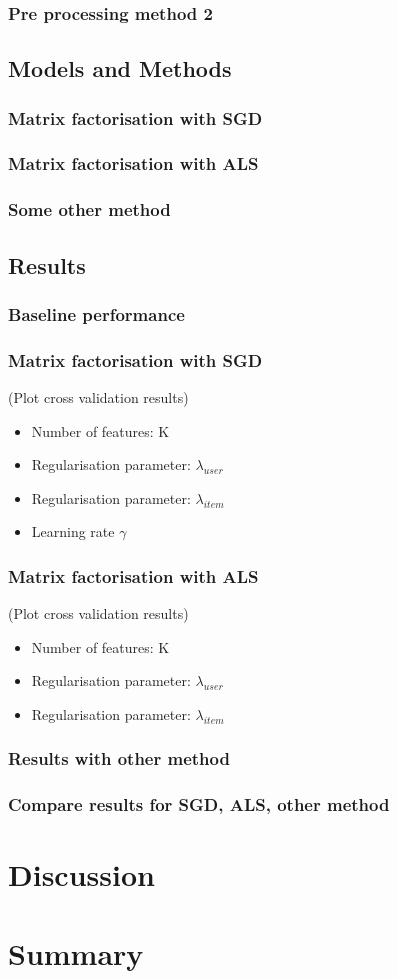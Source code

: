 \documentclass[10pt,conference,compsocconf]{IEEEtran}
\begin{document}
\subsubsection{Pre processing method 2}


\subsection{Models and Methods}
\subsubsection{Matrix factorisation with SGD}
\subsubsection{Matrix factorisation with ALS}
\subsubsection{Some other method}


\subsection{Results}
\subsubsection{Baseline performance}
\subsubsection{Matrix factorisation with SGD}
(Plot cross validation results)
\begin{itemize}
\item Number of features: K
\item Regularisation parameter: $\lambda_{user}$
\item Regularisation parameter: $\lambda_{item}$
\item Learning rate $\gamma$
\end{itemize}
\subsubsection{Matrix factorisation with ALS}
(Plot cross validation results)
\begin{itemize}
\item Number of features: K
\item Regularisation parameter: $\lambda_{user}$
\item Regularisation parameter: $\lambda_{item}$
\end{itemize}
\subsubsection{Results with other method}
\subsubsection{Compare results for SGD, ALS, other method}


\section{Discussion}

\section{Summary}


\end{document}
